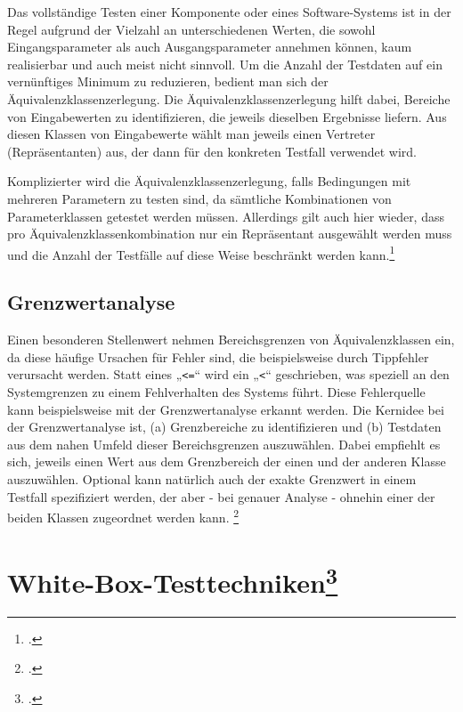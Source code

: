 \documentclass{lehramt-informatik}
\begin{document}
Das vollständige Testen einer Komponente oder eines Software-Systems ist
in der Regel aufgrund der Vielzahl an unterschiedenen Werten, die sowohl
Eingangsparameter als auch Ausgangsparameter annehmen können, kaum
realisierbar und auch meist nicht sinnvoll. Um die Anzahl der Testdaten
auf ein vernünftiges Minimum zu reduzieren, bedient man sich der
Äquivalenzklassenzerlegung. Die Äquivalenzklassenzerlegung hilft dabei,
Bereiche von Eingabewerten zu identifizieren, die jeweils dieselben
Ergebnisse liefern. Aus diesen Klassen von Eingabewerte wählt man
jeweils einen Vertreter (Repräsentanten) aus, der dann für den konkreten
Testfall verwendet wird.

Komplizierter wird die Äquivalenzklassenzerlegung, falls Bedingungen mit
mehreren Parametern zu testen sind, da sämtliche Kombinationen von
Parameterklassen getestet werden müssen. Allerdings gilt auch hier
wieder, dass pro Äquivalenzklassenkombination nur ein Repräsentant
ausgewählt werden muss und die Anzahl der Testfälle auf diese Weise
beschränkt werden kann.\footcite[Seite 142]{schatten}

%

\subsection{Grenzwertanalyse}

Einen besonderen Stellenwert nehmen Bereichsgrenzen von
Äquivalenzklassen ein, da diese häufige Ursachen für Fehler sind, die
beispielsweise durch Tippfehler verursacht werden. Statt eines
„\texttt{<=}“ wird ein „\texttt{<}“ geschrieben, was speziell an den
Systemgrenzen zu einem Fehlverhalten des Systems führt. Diese
Fehlerquelle kann beispielsweise mit der Grenzwertanalyse erkannt
werden. Die Kernidee bei der Grenzwertanalyse ist, (a) Grenzbereiche zu
identifizieren und (b) Testdaten aus dem nahen Umfeld dieser
Bereichsgrenzen auszuwählen. Dabei empfiehlt es sich, jeweils einen Wert
aus dem Grenzbereich der einen und der anderen Klasse auszuwählen.
Optional kann natürlich auch der exakte Grenzwert in einem Testfall
spezifiziert werden, der aber - bei genauer Analyse - ohnehin einer der
beiden Klassen zugeordnet werden kann.
\footcite[Seite 142]{schatten}

%

\section{White-Box-Testtechniken\footcite[Seite 199-246]{hoffmann}}
\end{document}
